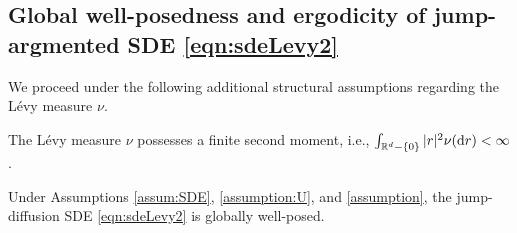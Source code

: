 \subsection{Global well-posedness and ergodicity of jump-argmented SDE \texorpdfstring{\eqref{eqn:sdeLevy2}}{(2.1)}}

We proceed under the following additional structural assumptions regarding the L\'{e}vy measure $\nu$.

\begin{assumption}\label{assumption}
    The L\'{e}vy measure $\nu$ possesses a finite second moment, i.e., $\int_{\mathbb{R}^d-\{0\}}|r|^2\nu(\mathrm{d} r)<\infty$. 
\end{assumption}

\begin{theorem}\label{theo:well-posedness}
    Under Assumptions \ref{assum:SDE}, \ref{assumption:U}, and \ref{assumption}, the jump-diffusion SDE \eqref{eqn:sdeLevy2} is globally well-posed.
\end{theorem}

